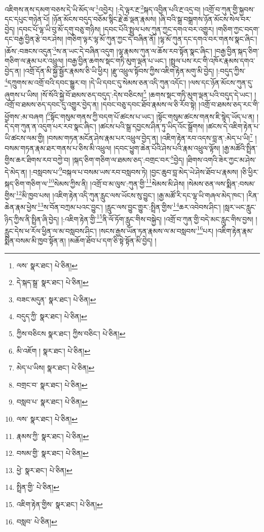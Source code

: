 འཇིགས་ནས་དམག་བཅས་དེ་ཡི་མོད་ལ་\footnote{ལས་  སྣར་ཐང་།  པེ་ཅིན། }འབྱེར། །:དེ་ལྟར་རྔ་\footnote{དེ་སྐད་སྒྲ་  སྣར་ཐང་།  པེ་ཅིན། }སྐད་འབྱིན་པའི་རྔ་འདྲ་བ། །འགྲོ་བ་ཀུན་གྱི་སྐྱབས་དང་དཔུང་གཉེན་པོ། །ཉོན་མོངས་བདུད་བཅོམ་སྙིང་རྗེ་ཆེ་ལྡན་རྣམས། །ཞི་བའི་སྒྲ་བསྒྲགས་ཉོན་མོངས་སེལ་བར་བྱེད། །དབང་པོ་ལྷ་ཡི་བུ་མོ་དགུ་བཅུ་གཉིས། །དབང་པོའི་སྤྲུལ་པས་ཀུན་ཀྱང་དགའ་བར་འགྱུར། །གཅིག་ཀྱང་བདག་དང་བརྒྱ་བྱིན་རྩེ་བར་ཤེས། །གཅིག་ལྟར་ལྷ་མོ་ཀུན་ཀྱང་དེ་བཞིན་ནོ། །ལྷ་མོ་ཀུན་དང་དགའ་བར་གནས་སྣང་ཞིང་། །ཆོས་:བཟངས་འདུན་\footnote{བཟང་མདུན་  སྣར་ཐང་།  པེ་ཅིན། }ས་ན་ཡང་དེ་བཞིན་འདུག །ལྷ་རྣམས་ཀུན་ལ་ཆོས་རབ་སྟོན་སྣང་ཞིང་། །བརྒྱ་བྱིན་སྐད་ཅིག་གཅིག་ལ་རྣམ་པར་འཕྲུལ། །བརྒྱ་བྱིན་ཆགས་སྡང་གཏི་མུག་ལྡན་པ་ཡང་། །སྤྲུལ་པས་རང་གི་འཁོར་རྣམས་དགའ་བྱེད་ན། །འགྲོ་དོན་མི་སྐྱོ་སྦྱོར་རྣམས་ཅི་ཡི་ཕྱིར། །རྫུ་འཕྲུལ་སྟོབས་ཀྱིས་འཇིག་རྟེན་མགུ་མི་བྱེད། །:བདུད་ཀྱིས་\footnote{བདུད་ཀྱི་  སྣར་ཐང་།  པེ་ཅིན། }དཀྲུགས་མ་འགྲོ་བའི་དབང་སྒྱུར་བ། །དེ་ཡི་དབང་དུ་སེམས་ཅན་འདི་ཀུན་འདོང་། །ལས་དང་ཉོན་མོངས་ཀུན་དུ་ཞུགས་པ་ཡིས། །སོ་སོའི་སྐྱེ་བོ་ཐམས་ཅད་བདུད་:དེས་བཅིངས།\footnote{ཀྱིས་བཅིངས  སྣར་ཐང་། ཀྱིས་བཅིང་།  པེ་ཅིན། } །ཆགས་སྡང་གཏི་མུག་ལྡན་པའི་བདུད་དེ་ཡང་། །འགྲོ་བ་ཐམས་ཅད་དབང་དུ་འགྱུར་བྱེད་ན། །དབང་བཅུ་དབང་ཐོབ་རྣམས་ལ་ཅི་རོབ་སྟེ། །འགྲོ་བ་ཐམས་ཅད་རང་གི་ཕྱོགས་:མ་བཞག །\footnote{མི་འཇོག །  སྣར་ཐང་།  པེ་ཅིན། }སྟོང་གསུམ་གནས་ཀྱི་བདག་པོ་ཚངས་པ་ཡང་། །སྟོང་གསུམ་ཚངས་གནས་ཇི་སྙེད་ཡོད་པ་ན། །དེ་དག་ཀུན་ན་འདུག་པར་རབ་སྣང་ཞིང་། །ཚངས་པའི་སྒྲ་དབྱངས་ཤིན་ཏུ་ཡིད་འོང་སྒྲོགས། །ཚངས་དེ་འཇིག་རྟེན་པ་ཡི་ཚངས་ལམ་གྱི། །བསམ་གཏན་མངོན་ཤེས་རྣམ་པར་འཕྲུལ་བྱེད་ན། །འཇིག་རྟེན་རབ་འདས་བླ་ན་:མེད་པ་ཡི།\footnote{མེད་པ་ཡིས།  སྣར་ཐང་།  པེ་ཅིན། } །བསམ་གཏན་རྣམ་ཐར་གནས་པ་ཅིས་མི་འཕྲུལ། །དབང་ཕྱུག་ཆེན་པོའི་ཤེས་པའི་རྣམ་འཕྲུལ་ལྟོས། །རྒྱ་མཚོའི་སྤྲིན་གྱིས་ཆར་ཐིགས་རབ་བཀྱེ་བ། །སྐད་ཅིག་གཅིག་ལ་ཐམས་ཅད་:བགྲང་བར་\footnote{བགྲང་བ་  སྣར་ཐང་།  པེ་ཅིན། }བྱེད། །ཐིགས་འགའི་ཟེར་ཀྱང་མ་ཤེས་དེ་མེད་ན། །:བསླབས་པ་\footnote{བསླབ་པ་  སྣར་ཐང་།  པེ་ཅིན། }བསྐལ་པ་བསམ་ཡས་རབ་བསླབས་ཏེ། །བྱང་ཆུབ་བླ་མེད་ཡེ་ཤེས་ཐོབ་པ་རྣམས། །ཅི་ཕྱིར་སྐད་ཅིག་གཅིག་ལ་\footnote{ལས་  སྣར་ཐང་།  པེ་ཅིན། }སེམས་ཀྱིས་ནི། །འགྲོ་བ་མ་ལུས་:ཀུན་གྱི་\footnote{རྣམས་ཀྱི་  སྣར་ཐང་།  པེ་ཅིན། }སེམས་མི་ཤེས། །སེམས་ཅན་ལས་སྨིན་:བསམ་གྱིས་\footnote{བསམ་གྱི་  སྣར་ཐང་།  པེ་ཅིན། }མི་ཁྱབ་པས། །འཇིག་རྟེན་འདི་ཀུན་རླུང་ལས་ཡོངས་སུ་བྱུང་། །རྒྱ་མཚོ་རི་དང་ལྷ་ཡི་གཞལ་མེད་ཁང་། །རིན་ཆེན་རྣམ་ཕྱེས་\footnote{ཕྱེ་  སྣར་ཐང་།  པེ་ཅིན། }ས་བོན་བཀྲམ་པའང་བྱུང་། །རླུང་ལས་བྱུང་གྱུར་:སྤྲིན་གྱིས་\footnote{སྤྲིན་གྱི་  པེ་ཅིན། }ཆར་འབེབས་ཤིང་། །སླར་ཡང་རླུང་ཉིད་ཀྱིས་ནི་སྤྲིན་ཞི་བྱེད། །:འཇིག་རྟེན་གྱི་\footnote{འཇིག་རྟེན་གྱིས་  སྣར་ཐང་།  པེ་ཅིན། }ནི་ལོ་ཏོག་རླུང་གིས་བསྐྱེད། །འགྲོ་བ་ཀུན་གྱི་བདེ་མང་རླུང་གིས་བྱས། །རླུང་དེས་ཕ་རོལ་ཕྱིན་ལ་མ་བསླབས་ཤིང་། །སངས་རྒྱས་ཡོན་ཏན་རྣམས་ལ་མ་བསླབས་\footnote{བསླབ་  པེ་ཅིན། }པར། །འཇིག་རྟེན་རྣམ་སྨིན་བསམ་མི་ཁྱབ་སྟོན་ན། །མཆོག་ཐོབ་པ་དག་ཅི་སྟེ་སྟོན་མི་བྱེད། །
